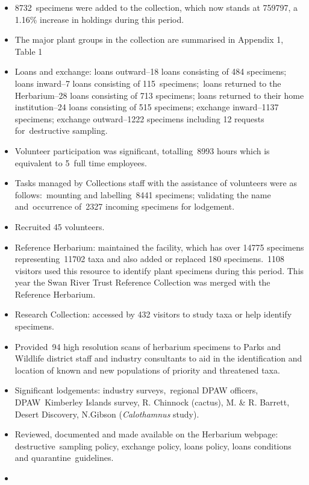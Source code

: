 \documentclass[version=last,
    paper=a4, %
    10pt, %
    usenames,
    dvipsnames,
    oneside, %
    headings=openany, %
    DIV=15 %
]{scrbook}
\begin{document}
\begin{itemize}
\itemsep1pt\parskip0pt
\item
  8732~specimens were added to the collection, which now stands at
  759797, a 1.16\% increase in holdings during this period.
\item
  The major plant groups in the collection are summarised in Appendix 1,
  Table 1
\item
  Loans and exchange: loans outward--18 loans consisting of 484
  specimens; loans inward--7 loans consisting of 115~specimens;~loans
  returned to the Herbarium--28 loans consisting of 713 specimens; loans
  returned to their home institution--24 loans consisting of 515
  specimens; exchange inward--1137 specimens; exchange outward--1222
  specimens including 12 requests for~destructive sampling.
\item
  Volunteer participation was significant, totalling~8993 hours which is
  equivalent to 5~full time employees.
\item
  Tasks managed by Collections staff with the assistance of volunteers
  were as follows:~mounting and labelling~8441 specimens; validating the
  name and~occurrence of~2327 incoming specimens for lodgement.
\item
  Recruited 45 volunteers.
\item
  Reference Herbarium: maintained the facility, which has over 14775
  specimens representing~11702 taxa and also added or replaced 180
  specimens.~1108 visitors used this resource to identify plant
  specimens during this period. This year the Swan River Trust Reference
  Collection was merged with the Reference Herbarium.
\item
  Research Collection: accessed by 432 visitors to study taxa or help
  identify specimens.
\item
  Provided~94 high resolution scans of herbarium specimens to Parks and
  Wildlife district staff and industry consultants to aid in the
  identification and location of known and new populations of priority
  and threatened taxa.
\item
  Significant lodgements: industry surveys,~regional DPAW officers,
  DPAW~Kimberley Islands survey, R. Chinnock (cactus), M. \& R. Barrett,
  Desert Discovery, N.Gibson (\emph{Calothamnus} study).
\item
  Reviewed, documented and made available on the Herbarium webpage:
  destructive~sampling policy, exchange policy, loans policy, loans
  conditions and quarantine~guidelines.
\item

\end{itemize}
\end{document}
